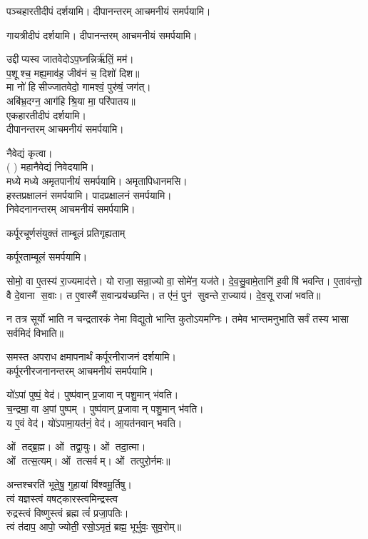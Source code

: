 \begin{center}
पञ्चहारतीदीपं दर्शयामि। दीपानन्तरम् आचमनीयं समर्पयामि।\medskip

गायत्रीदीपं दर्शयामि। दीपानन्तरम् आचमनीयं समर्पयामि।\medskip

उद्दीप्यस्व जातवेदोऽप॒घ्नन्निर्ऋ॑तिं॒ मम॑।\\
प॒शूश्च॒ मह्य॒माव॑ह॒ जीव॑नं च॒ दिशो॑ दिश॥ \\
मा नो॑ हिसीज्जातवेदो॒ गामश्वं॒ पुरु॑षं॒ जग॑त्।\\
अबि॑भ्र॒दग्न॒ आग॑हि श्रि॒या मा॒ परि॑पातय॥ \\
\swamine{} एकहारतीदीपं दर्शयामि।\\
दीपानन्तरम् आचमनीयं समर्पयामि।\medskip

नैवेद्यं कृत्वा।\\
\swamine{} ( ) महानैवेद्यं निवेदयामि।\\
मध्ये मध्ये अमृतपानीयं समर्पयामि। अमृतापिधानमसि।\\
हस्तप्रक्षालनं समर्पयामि। पादप्रक्षालनं समर्पयामि।\\
निवेदनानन्तरम् आचमनीयं समर्पयामि।\medskip

{कर्पूरचूर्णसंयुक्तं ताम्बूलं प्रतिगृह्यताम्}

कर्पूरताम्बूलं समर्पयामि।\medskip

सोमो॒ वा ए॒तस्य॑ रा॒ज्यमाद॑त्ते।
यो राजा॒ सन्रा॒ज्यो वा॒ सोमे॑न॒ यज॑ते।
दे॒व॒सु॒वामे॒तानि॑ ह॒वीषि॑ भवन्ति।
ए॒ताव॑न्तो॒ वै दे॒वाना स॒वाः।
त ए॒वास्मै॑ स॒वान्प्रय॑च्छन्ति।
त ए॑नं॒ पुन॑ सुवन्ते रा॒ज्याय॑।
दे॒व॒सू राजा॑ भवति॥

न तत्र सूर्यो भाति न चन्द्रतारकं नेमा विद्युतो भान्ति कुतोऽयमग्निः।
तमेव भान्तमनुभाति सर्वं तस्य भासा सर्वमिदं विभाति॥


\swamine{} समस्त अपराध क्षमापनार्थं कर्पूरनीराजनं दर्शयामि।\\
कर्पूरनीरजनानन्तरम् आचमनीयं समर्पयामि।\medskip


यो॑ऽपां पुष्पं॒ वेद॑। पुष्प॑वान् प्र॒जावान् पशु॒मान् भ॑वति।\\
च॒न्द्रमा॒ वा अ॒पां पुष्पम्। पुष्प॑वान् प्र॒जावान् पशु॒मान् भ॑वति।\\
य ए॒वं वेद॑। यो॑ऽपामा॒यत॑नं॒ वेद॑। आ॒यत॑नवान् भवति।\medskip

ओं तद्ब्र॒ह्म। ओं तद्वा॒युः। ओं तदा॒त्मा।\\ ओं तत्स॒त्यम्‌।
ओं तत्सर्वम्‌। ओं तत्पुरो॒र्नमः॥\medskip

अन्तश्चरति॑ भूते॒षु॒ गुहायां वि॑श्वमू॒र्तिषु। \\
त्वं यज्ञस्त्वं वषट्कारस्त्वमिन्द्रस्त्व\\ रुद्रस्त्वं विष्णुस्त्वं ब्रह्म त्वं॑ प्रजा॒पतिः। \\
त्वं त॑दाप॒ आपो॒ ज्योती॒ रसो॒ऽमृतं॒ ब्रह्म॒ भूर्भुवः॒ सुव॒रोम्‌॥\medskip


\end{center}

